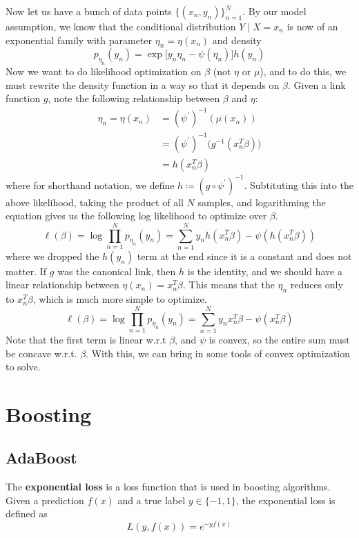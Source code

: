 \documentclass{article}
\begin{document}
    Now let us have a bunch of data points $\{(x_n, y_n)\}_{n=1}^N$. By our model assumption, we know that the conditional distribution $Y \mid X = x_n$ is now of an exponential family with parameter $\eta_n = \eta (x_n)$ and density 
    \[p_{\eta_n} (y_n) = \exp \big[ y_n \eta_n - \psi(\eta_n) \big] h(y_n)\]
    Now we want to do likelihood optimization on $\beta$ (not $\eta$ or $\mu$), and to do this, we must rewrite the density function in a way so that it depends on $\beta$. Given a link function $g$, note the following relationship between $\beta$ and $\eta$: 
    \begin{align*}
        \eta_n = \eta (x_n) & = (\psi^\prime)^{-1} (\mu (x_n)) \\
        & = (\psi^{\prime})^{-1} \big( g^{-1} (x_n^T \beta )\big) \\
        & = h(x_n^T \beta) 
    \end{align*}
    where for shorthand notation, we define $h \coloneqq (g \circ \psi^\prime)^{-1}$. Subtituting this into the above likelihood, taking the product of all $N$ samples, and logarithming the equation gives us the following log likelihood to optimize over $\beta$. 
    \[\ell(\beta) = \log \prod_{n=1}^N p_{\eta_n} (y_n) = \sum_{n=1}^N y_n h(x_n^T \beta)  - \psi(h(x_n^T \beta) )\]
    where we dropped the $h(y_n)$ term at the end since it is a constant and does not matter. If $g$ was the canonical link, then $h$ is the identity, and we should have a linear relationship between $\eta (x_n) = x_n^T \beta$. This means that the $\eta_n$ reduces only to $x_n^T \beta$, which is much more simple to optimize. 
    \[\ell(\beta) = \log \prod_{n=1}^N p_{\eta_n} (y_n) = \sum_{n=1}^N y_n x_n^T \beta - \psi(x_n^T \beta)\]
    Note that the first term is linear w.r.t $\beta$, and $\psi$ is convex, so the entire sum must be concave w.r.t. $\beta$. With this, we can bring in some tools of convex optimization to solve. 

\section{Boosting} 

  \subsection{AdaBoost} 

    \begin{definition}
    The \textbf{exponential loss} is a loss function that is used in boosting algorithms. Given a prediction $f(x)$ and a true label $y \in \{-1, 1\}$, the exponential loss is defined as 
    \begin{equation}
      L(y, f(x)) = e^{-y f(x)}
    \end{equation}
    \end{definition}
\end{document}
